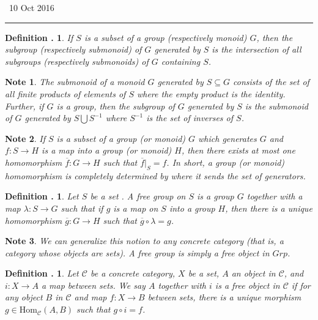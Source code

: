 \documentclass[twoside]{report}
\newcommand{\Hom}{\textrm{Hom}}
\newcommand{\fanC}{\mathscr{C}}
\newcounter{Lecture}
\newcommand{\newLec}[1]{
  \stepcounter{Lecture}
  \noindent{\Large\bf Lecture \arabic{Lecture}} \, #1 \hfill  \rule[1ex]{2.5in}{.1pt} \vspace{1em}
}
\theoremstyle{myts}
\newcounter{c}[Lecture]
\newtheorem{dfn}[c]{Definition \arabic{Lecture}.}
\newtheorem*{nte}{Note}
\newcounter{ex}
\begin{document}
\newLec{10 Oct 2016}

\begin{dfn}
  If $S$ is a subset of a group (respectively monoid) $G$, then the \emph{subgroup} (respectively \emph{submonoid}) of $G$ \emph{generated by $S$} is the intersection of all subgroups (respectively submonoids) of $G$ containing $S$.
\end{dfn}

\begin{nte}
  The submonoid of a monoid $G$ generated by \( S \subseteq G \) consists of the set of all finite products of elements of $S$ where the empty product is the identity. Further, if $G$  is a group, then the subgroup of $G$ generated by $S$ is the submonoid of $G$ generated by \( S \bigcup S^{-1} \) where $S^{-1}$ is the set of inverses of $S$.
\end{nte}

\begin{nte}
  If $S$ is a subset of a group (or monoid) $G$ which generates $G$ and \( f : S \to H \) is a map into a group (or monoid) $H$, then there exists at most one homomorphism \( \overline{f} : G \to H \) such that \(\overline{f}|_S = f \). In short, a group (or monoid) homomorphism is completely determined by where it sends the set of generators.
\end{nte}

\begin{dfn}
  Let $S$ be a set . A \emph{free group} on $S$ is a group $G$ together with a map \( \lambda : S \to G \) such that if $g$ is a map on $S$ into a group $H$, then there is a unique homomorphism \( \overline{g} : G \to H \) such that \( \overline{g} \circ \lambda = g \).
\end{dfn}

\begin{nte}
  We can generalize this notion to any concrete category (that is, a category whose objects are sets). A free group is simply a free object in $Grp$.
\end{nte}

\begin{dfn}
  Let $\fanC$ be a concrete category, $X$ be a set, $A$ an object in $\fanC$, and \( i: X \to A \) a map between sets. We say $A$ together with $i$ is a \emph{free object} in $\fanC$ if for any object $B$ in $\fanC$ and map \( f : X \to B \) between sets, there is a unique morphism \(g\in\Hom_\fanC(A,B)\) such that \( g \circ i = f \).
\end{dfn}
\end{document}
